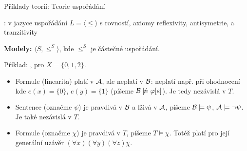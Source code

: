 \documentclass{beamer}
\begin{document}
\begin{frame}{Příklady teorií: Teorie uspořádání}

    : v jazyce uspořádání $L=\langle\leq\rangle$ s rovností, axiomy \alert{reflexivity}, \alert{antisymetrie}, a \alert{tranzitivity}


    \textbf{Modely:} $\langle S,\leq^S\rangle$, kde $\leq^S$ je \alert{částečné uspořádání}. 
    
    Příklad: ,  pro $X=\{0,1,2\}$.
    \begin{itemize}
        \item Formule  (\alert{linearita}) platí v $\mathcal{A}$, ale neplatí v $\mathcal{B}$: neplatí např. při ohodnocení kde $e(x)=\{0\}$, $e(y)=\{1\}$ (píšeme $\mathcal{B}\not\models\varphi[e]$). Je tedy nezávislá v $T$.
        \item Sentence  (označme $\psi$) je pravdivá v $\mathcal{B}$ a lživá v $\mathcal{A}$, píšeme $\mathcal{B}\models\psi$, $\mathcal{A}\models\neg\psi$. Je také nezávislá v $T$.
        \item Formule  (označme  $\chi$) je pravdivá v $T$, píšeme $T\models\chi$. Totéž platí pro její \alert{generální uzávěr} $(\forall x)(\forall y)(\forall z)\chi$.
    \end{itemize}

\end{frame}
\end{document}
